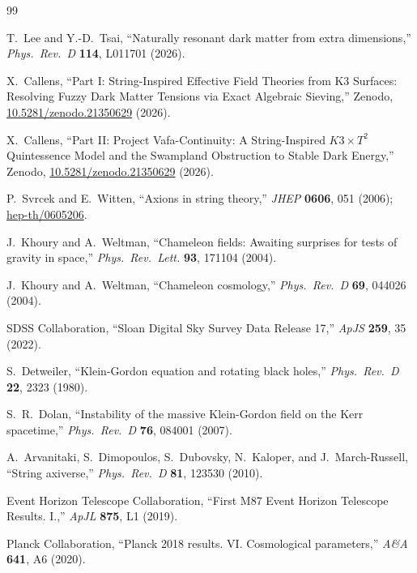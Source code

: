 \documentclass[12pt]{article}
\begin{document}
\begin{thebibliography}{99}

T.~Lee and Y.-D.~Tsai, ``Naturally resonant dark matter from extra dimensions,''
\textit{Phys.\ Rev.\ D} \textbf{114}, L011701 (2026).

X.~Callens, ``Part I: String-Inspired Effective Field Theories from K3 Surfaces: Resolving Fuzzy Dark Matter Tensions via Exact Algebraic Sieving,''
Zenodo, \href{https://doi.org/10.5281/zenodo.21350629}{10.5281/zenodo.21350629} (2026).

X.~Callens, ``Part II: Project Vafa-Continuity: A String-Inspired $K3 \times T^2$ Quintessence Model and the Swampland Obstruction to Stable Dark Energy,''
Zenodo, \href{https://doi.org/10.5281/zenodo.21350629}{10.5281/zenodo.21350629} (2026).

P.~Svrcek and E.~Witten, ``Axions in string theory,''
\textit{JHEP} \textbf{0606}, 051 (2006);
\href{https://arxiv.org/abs/hep-th/0605206}{hep-th/0605206}.

J.~Khoury and A.~Weltman, ``Chameleon fields: Awaiting surprises for tests of gravity in space,''
\textit{Phys.\ Rev.\ Lett.} \textbf{93}, 171104 (2004).

J.~Khoury and A.~Weltman, ``Chameleon cosmology,''
\textit{Phys.\ Rev.\ D} \textbf{69}, 044026 (2004).

SDSS Collaboration, ``Sloan Digital Sky Survey Data Release 17,''
\textit{ApJS} \textbf{259}, 35 (2022).

S.~Detweiler, ``Klein-Gordon equation and rotating black holes,''
\textit{Phys.\ Rev.\ D} \textbf{22}, 2323 (1980).

S.~R.~Dolan, ``Instability of the massive Klein-Gordon field on the Kerr spacetime,''
\textit{Phys.\ Rev.\ D} \textbf{76}, 084001 (2007).

A.~Arvanitaki, S.~Dimopoulos, S.~Dubovsky, N.~Kaloper, and J.~March-Russell,
``String axiverse,''
\textit{Phys.\ Rev.\ D} \textbf{81}, 123530 (2010).

Event Horizon Telescope Collaboration, ``First M87 Event Horizon Telescope Results. I.,''
\textit{ApJL} \textbf{875}, L1 (2019).

Planck Collaboration, ``Planck 2018 results. VI. Cosmological parameters,''
\textit{A\&A} \textbf{641}, A6 (2020).

\end{thebibliography}
\end{document}

